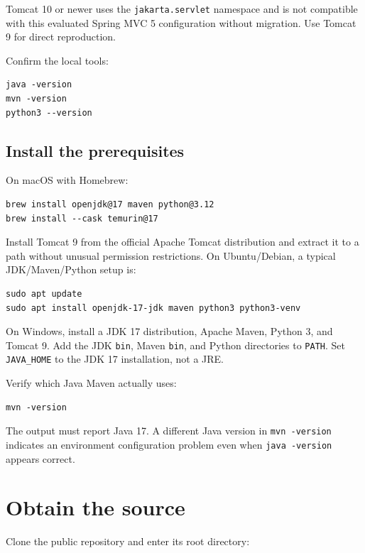 \documentclass[11pt,a4paper]{article}
\begin{document}
Tomcat 10 or newer uses the \texttt{jakarta.servlet} namespace and is not compatible with this evaluated Spring MVC 5 configuration without migration. Use Tomcat 9 for direct reproduction.

Confirm the local tools:

\begin{lstlisting}[style=terminal]
java -version
mvn -version
python3 --version
\end{lstlisting}

\subsection{Install the prerequisites}

On macOS with Homebrew:

\begin{lstlisting}[style=terminal]
brew install openjdk@17 maven python@3.12
brew install --cask temurin@17
\end{lstlisting}

Install Tomcat 9 from the official Apache Tomcat distribution and extract it to a path without unusual permission restrictions. On Ubuntu/Debian, a typical JDK/Maven/Python setup is:

\begin{lstlisting}[style=terminal]
sudo apt update
sudo apt install openjdk-17-jdk maven python3 python3-venv
\end{lstlisting}

On Windows, install a JDK 17 distribution, Apache Maven, Python 3, and Tomcat 9. Add the JDK \texttt{bin}, Maven \texttt{bin}, and Python directories to \texttt{PATH}. Set \texttt{JAVA\_HOME} to the JDK 17 installation, not a JRE.

Verify which Java Maven actually uses:

\begin{lstlisting}[style=terminal]
mvn -version
\end{lstlisting}

The output must report Java 17. A different Java version in \texttt{mvn -version} indicates an environment configuration problem even when \texttt{java -version} appears correct.

\section{Obtain the source}

Clone the public repository and enter its root directory:
\end{document}
